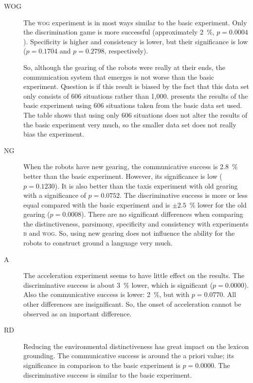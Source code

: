 \clearpage
\begin{description}
\item[WOG] The {\scshape wog} experiment is in most ways similar to the basic experiment. Only the discrimination game is more successful (approximately 2~\%, $p=0.0004$). Specificity is higher and consistency is lower, but their significance is low ($p=0.1704$ and $p=0.2798$, respectively).

So, although the gearing of the robots were really at their ends, the communication system that emerges is not worse than the basic experiment. Question is if this result is biased by the fact that this data set only consists of 606 situations rather than 1,000.  presents the results of the basic experiment using 606 situations taken from the basic data set used. The table shows that using only 606 situations does not alter the results of the basic experiment very much, so the smaller data set does not really bias the experiment. 

\item[NG] When the robots have new gearing, the communicative success is 2.8~\% better than the basic experiment. However, its significance is low ($p=0.1230$). It is also better than the taxis experiment with old gearing with a significance of $p=0.0752$. The discriminative success is more or less equal compared with the basic experiment and is $\pm 2.5$~\% lower for the old gearing ($p=0.0008$). There are no significant differences when comparing the distinctiveness, parsimony, specificity and consistency with experiments {\scshape b} and {\scshape wog}. So, using new gearing does not influence the ability for the robots to construct ground a language very much.

\item[A] The acceleration experiment seems to have little effect on the results. The discriminative success is about 3~\% lower, which is significant ($p=0.0000$). Also the communicative success is lower: 2~\%, but with $p=0.0770$. All other differences are insignificant. So, the onset of acceleration cannot be observed as an important difference.

\item[RD] Reducing the environmental distinctiveness has great impact on the lexicon grounding. The communicative success is around the a priori value; its significance in comparison to the basic experiment is $p=0.0000$. The discriminative success is similar to the basic experiment. 


\end{description}
